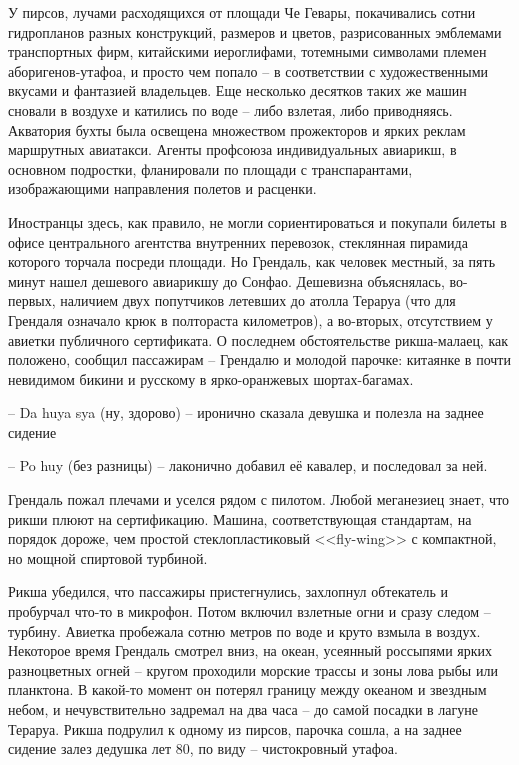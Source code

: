 У пирсов, лучами расходящихся от площади Че Гевары, покачивались сотни гидропланов разных конструкций, размеров и цветов, разрисованных эмблемами транспортных фирм, китайскими иероглифами, тотемными символами племен аборигенов-утафоа, и просто чем попало -- в соответствии с художественными вкусами и фантазией владельцев. Еще несколько десятков таких же машин сновали в воздухе и катились по воде -- либо взлетая, либо приводняясь. Акватория бухты была освещена множеством прожекторов и ярких реклам маршрутных авиатакси. Агенты профсоюза индивидуальных авиарикш, в основном подростки, фланировали по площади с транспарантами, изображающими направления полетов и расценки.

Иностранцы здесь, как правило, не могли сориентироваться и покупали билеты в офисе центрального агентства внутренних перевозок, стеклянная пирамида которого торчала посреди площади. Но Грендаль, как человек местный, за пять минут нашел дешевого авиарикшу до Сонфао. Дешевизна объяснялась, во-первых, наличием двух попутчиков летевших до атолла Тераруа (что для Грендаля означало крюк в полтораста километров), а во-вторых, отсутствием у авиетки публичного сертификата. О последнем обстоятельстве рикша-малаец, как положено, сообщил пассажирам -- Грендалю и молодой парочке: китаянке в почти невидимом бикини и русскому в ярко-оранжевых шортах-багамах.

-- Da huya sya (ну, здорово) -- иронично сказала девушка и полезла на заднее сидение

-- Po huy (без разницы) -- лаконично добавил её кавалер, и последовал за ней.

Грендаль пожал плечами и уселся рядом с пилотом. Любой меганезиец знает, что рикши плюют на сертификацию. Машина, соответствующая стандартам, на порядок дороже, чем простой стеклопластиковый <<fly-wing>> с компактной, но мощной спиртовой турбиной.

Рикша убедился, что пассажиры пристегнулись, захлопнул обтекатель и пробурчал что-то в микрофон. Потом включил взлетные огни и сразу следом -- турбину. Авиетка пробежала сотню метров по воде и круто взмыла в воздух. Некоторое время Грендаль смотрел вниз, на океан, усеянный россыпями ярких разноцветных огней -- кругом проходили морские трассы и зоны лова рыбы или планктона. В какой-то момент он потерял границу между океаном и звездным небом, и нечувствительно задремал на два часа -- до самой посадки в лагуне Тераруа. Рикша подрулил к одному из пирсов, парочка сошла, а на заднее сидение залез дедушка лет 80, по виду -- чистокровный утафоа.

